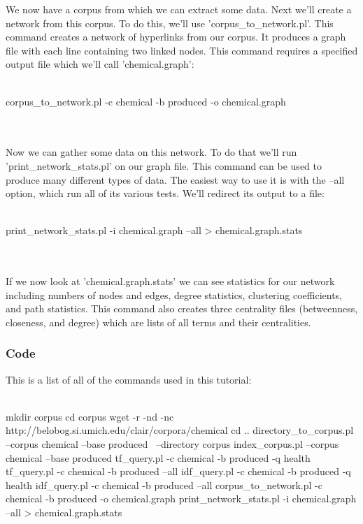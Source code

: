 We now have a corpus from which we can extract some data.  Next we'll create a network from this corpus.  To do this, we'll use 'corpus\_to\_network.pl'.  This command creates a network of hyperlinks from our corpus.  It produces a graph file with each line containing two linked nodes.  This command requires a specified output file which we'll call 'chemical.graph':
\\
\\
\begin{boxedverbatim}
 corpus_to_network.pl -c chemical -b produced -o chemical.graph
\end{boxedverbatim}
\\
\\
Now we can gather some data on this network.  To do that we'll run 'print\_network\_stats.pl' on our graph file.  This command can be used to produce many different types of data.  The easiest way to use it is with the --all option, which run all of its various tests.  We'll redirect its output to a file:
\\
\\
\begin{boxedverbatim}
 print_network_stats.pl -i chemical.graph --all > chemical.graph.stats
\end{boxedverbatim}
\\
\\
If we now look at 'chemical.graph.stats' we can see statistics for our network including numbers of nodes and edges, degree statistics, clustering coefficients, and path statistics.  This command also creates three centrality files (betweenness, closeness, and degree) which are lists of all terms and their centralities.


\subsubsection{Code}

This is a list of all of the commands used in this tutorial:
\\
\\
\begin{boxedverbatim}
 mkdir corpus
 cd corpus
 wget -r -nd -nc http://belobog.si.umich.edu/clair/corpora/chemical
 cd ..
 directory_to_corpus.pl --corpus chemical --base produced \
  --directory corpus
 index_corpus.pl --corpus chemical --base produced
 tf_query.pl -c chemical -b produced -q health
 tf_query.pl -c chemical -b produced --all
 idf_query.pl -c chemical -b produced -q health
 idf_query.pl -c chemical -b produced --all
 corpus_to_network.pl -c chemical -b produced -o chemical.graph
 print_network_stats.pl -i chemical.graph --all > chemical.graph.stats
\end{boxedverbatim}

